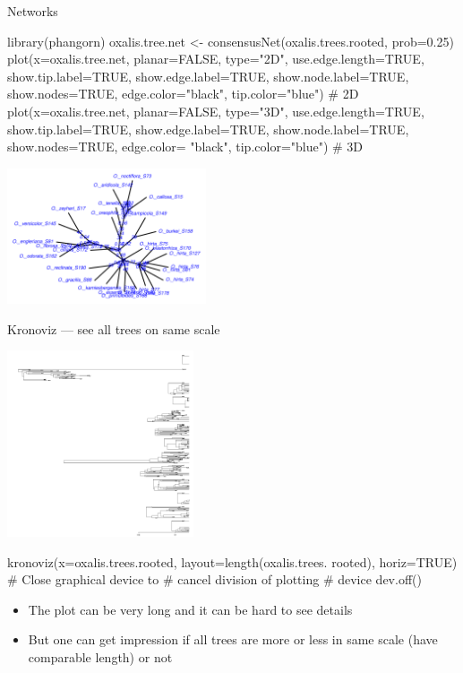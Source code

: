 \documentclass[compress, ucs, xelatex, 11pt, xcolor=svgnames,
	hyperref={
		bookmarks=true,
		unicode=true,
		colorlinks=true,
		pdftitle={Molecular data in R},
		plainpages=false,
		pdfauthor={Vojtech Zeisek},
		pdfsubject={Course about phylogeny and evolution in R},
		pdfcreator={XeLaTeX},
		pdfkeywords={R, evolution, phylogeny, molecular data},
		linkcolor=Tomato,
		anchorcolor=SaddleBrown,
		citecolor=Goldenrod,
		filecolor=DarkMagenta,
		menucolor=Sienna,
		urlcolor=DarkTurquoise,
		pdftex},
	url={hyphens, lowtilde} %
	]{beamer}
\begin{document}
\begin{frame}[fragile]{Networks}
	\begin{spluscode}
    library(phangorn)
    oxalis.tree.net <- consensusNet(oxalis.trees.rooted, prob=0.25)
    plot(x=oxalis.tree.net, planar=FALSE, type="2D", use.edge.length=TRUE,
      show.tip.label=TRUE, show.edge.label=TRUE, show.node.label=TRUE,
      show.nodes=TRUE, edge.color="black", tip.color="blue") # 2D
    plot(x=oxalis.tree.net, planar=FALSE, type="3D", use.edge.length=TRUE,
      show.tip.label=TRUE, show.edge.label=TRUE, show.node.label=TRUE,
      show.nodes=TRUE, edge.color= "black", tip.color="blue") # 3D
	\end{spluscode}
	\begin{center}
		\includegraphics[height=4cm]{oxalis-net.png}
	\end{center}
\end{frame}

\begin{frame}[fragile]{Kronoviz --- see all trees on same scale}
	\begin{multicols}{2}
		\includegraphics[height=5.5cm]{kronoviz.png}
		\begin{spluscode}
    kronoviz(x=oxalis.trees.rooted,
      layout=length(oxalis.trees.
      rooted), horiz=TRUE)
    # Close graphical device to
    # cancel division of plotting
    # device
    dev.off()
		\end{spluscode}
		\vfill
		\begin{itemize}
			\item The plot can be very long and it can be hard to see details
			\item But one can get impression if all trees are more or less in same scale (have comparable length) or not
		\end{itemize}
		\vfil
	\end{multicols}
\end{frame}
\end{document}
